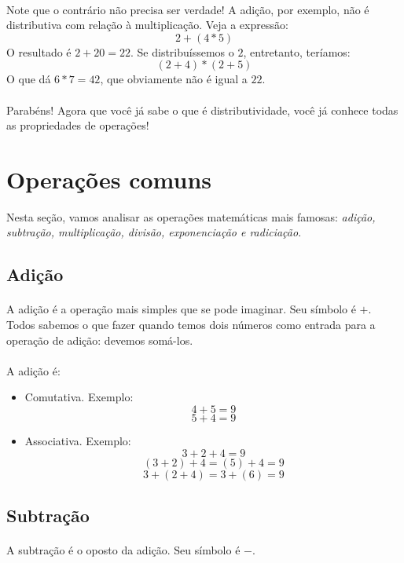 \documentclass{article}
\begin{document}
\paragraph{}
Note que o contrário não precisa ser verdade! A adição, por exemplo, não é 
distributiva com relação à multiplicação. Veja a expressão:
$$2 + (4*5)$$
O resultado é $2 + 20 = 22$. Se distribuíssemos o $2$, entretanto, teríamos:
$$(2+4) * (2+5)$$
O que dá $6*7 = 42$, que obviamente não é igual a $22$.
\paragraph{}
Parabéns! Agora que você já sabe o que é distributividade, você já conhece 
todas as propriedades de operações!

\section{Operações comuns}
Nesta seção, vamos analisar as operações matemáticas mais famosas: 
\textit{adição, subtração, multiplicação, divisão, exponenciação e radiciação}.

\subsection{Adição}
\paragraph{}
A adição é a operação mais simples que se pode imaginar. Seu símbolo é $+$.
Todos sabemos o que fazer quando temos dois números como entrada para a operação
de adição: devemos somá-los. 
\paragraph{}
A adição é:
\begin{itemize}
\item Comutativa. Exemplo:
$$4 + 5 = 9$$
$$5 + 4 = 9$$
\item Associativa. Exemplo:
$$3 + 2 + 4 = 9$$
$$(3 + 2) + 4 = (5) + 4 = 9$$
$$3 + (2 + 4) = 3 + (6) = 9$$
\end{itemize}

\subsection{Subtração}
\paragraph{}
A subtração é o oposto da adição. Seu símbolo é $-$.
\end{document}
